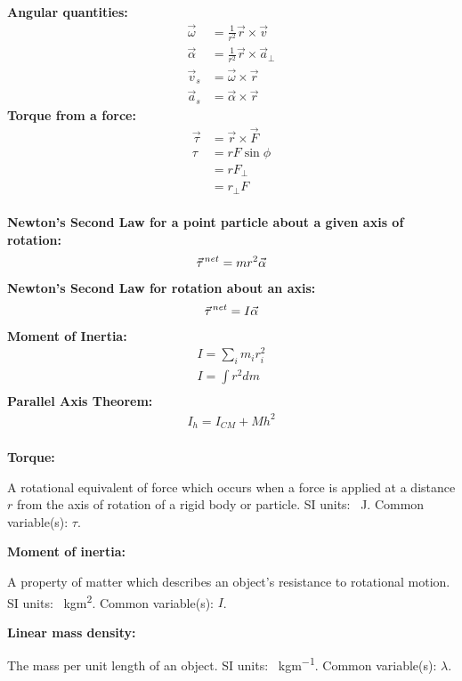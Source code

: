 \newpage
\begin{importantEquations}
\medskip
\begin{multicols}{2}
\textbf{Angular quantities:}
\begin{align*}
\vec\omega &= \frac{1}{r^2}\vec r \times \vec v\\
\vec\alpha &= \frac{1}{r^2}\vec r \times \vec a_\perp\\
\vec v_s &= \vec \omega \times \vec r\nonumber\\
\vec a_s&= \vec \alpha \times \vec r
\end{align*}
\textbf{Torque from a force:}
\begin{align*}
\vec\tau &= \vec r \times \vec F\\
\tau &= rF\sin\phi\\
&=rF_\perp\\
&=r_\perp F
\end{align*}
\columnbreak
\\
\textbf{Newton's Second Law for a point particle about a given axis of rotation:}
\begin{align*}
\pvec \tau^{net} = mr^2 \vec\alpha
\end{align*}
\textbf{Newton's Second Law for rotation about an axis:}
\begin{align*}
\pvec \tau^{net} = I\vec\alpha
\end{align*}
\textbf{Moment of Inertia:}
\begin{align*}
I = \sum_i m_ir_i^2\\
I = \int r^2 dm\\
\end{align*}
\textbf{Parallel Axis Theorem:}
\begin{align*}
I_h = I_{CM} + Mh^2\\
\end{align*}
\medskip
\end{multicols}
\end{importantEquations}


\begin{definitions}
	
	\textbf{Torque:}
	\item A rotational equivalent of force which occurs when a force is applied at a distance $r$ from the axis of rotation of a rigid body or particle. SI units: \SI{}{J}. Common variable(s): $\tau$.
	\medskip
	
	\item \textbf{Moment of inertia:}
	\item A property of matter which describes an object's resistance to rotational motion. SI units: \SI{}{kgm^2}. Common variable(s): $I$.
	\medskip
	
	\item \textbf{Linear mass density:}
	\item The mass per unit length of an object. SI units: \SI{}{kgm^{-1}}. Common variable(s): $\lambda$.
	\medskip
	
\end{definitions}

